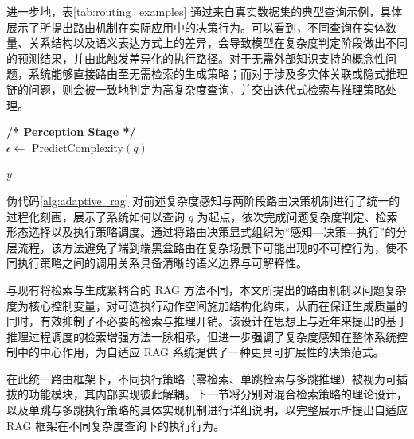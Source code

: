 进一步地，表\ref{tab:routing_examples} 通过来自真实数据集的典型查询示例，具体展示了所提出路由机制在实际应用中的决策行为。可以看到，不同查询在实体数量、关系结构以及语义表达方式上的差异，会导致模型在复杂度判定阶段做出不同的预测结果，并由此触发差异化的执行路径。对于无需外部知识支持的概念性问题，系统能够直接路由至无需检索的生成策略；而对于涉及多实体关联或隐式推理链的问题，则会被一致地判定为高复杂度查询，并交由迭代式检索与推理策略处理。

\begin{algorithm}[htbp]
\caption{复杂度感知的自适应 RAG 总体流程}
\label{alg:adaptive_rag}

\textbf{/* Perception Stage */} \\
$\mathcal{c} \gets$ PredictComplexity$(q)$ \;

\Return $y$
\end{algorithm}

 伪代码\ref{alg:adaptive_rag} 对前述复杂度感知与两阶段路由决策机制进行了统一的过程化刻画，展示了系统如何以查询 $q$ 为起点，依次完成问题复杂度判定、检索形态选择以及执行策略调度。通过将路由决策显式组织为“感知—决策—执行”的分层流程，该方法避免了端到端黑盒路由在复杂场景下可能出现的不可控行为，使不同执行策略之间的调用关系具备清晰的语义边界与可解释性。

与现有将检索与生成紧耦合的 RAG 方法不同，本文所提出的路由机制以问题复杂度为核心控制变量，对可选执行动作空间施加结构化约束，从而在保证生成质量的同时，有效抑制了不必要的检索与推理开销。该设计在思想上与近年来提出的基于推理过程调度的检索增强方法一脉相承，但进一步强调了复杂度感知在整体系统控制中的中心作用，为自适应 RAG 系统提供了一种更具可扩展性的决策范式。

在此统一路由框架下，不同执行策略（零检索、单跳检索与多跳推理）被视为可插拔的功能模块，其内部实现彼此解耦。下一节将分别对混合检索策略的理论设计，以及单跳与多跳执行策略的具体实现机制进行详细说明，以完整展示所提出自适应 RAG 框架在不同复杂度查询下的执行行为。

